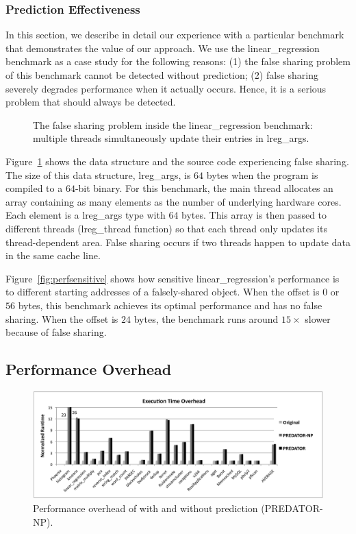 \subsubsection{Prediction Effectiveness}
\label{sec:predicteval}
In this section, we describe in detail our experience with a particular benchmark that demonstrates the value of our approach. We use the linear\_regression benchmark as a case study for the following reasons: (1) the false sharing problem of this benchmark cannot be detected without prediction; (2) false sharing severely degrades performance when it actually occurs. Hence, it is a serious problem that should always be detected. 

\begin{figure}[!t]
{\centering
\subfigure{}
\caption{The false sharing problem inside the linear\_regression benchmark: multiple threads simultaneously update their entries in lreg\_args.
\label{fig:linearregression}}
}
\end{figure}

Figure~\ref{fig:linearregression} shows the data structure and the source code experiencing false sharing. The size of this data structure, lreg\_args, is $64$ bytes 
when the program is compiled to a $64$-bit binary. For this benchmark, the main thread allocates an array containing as many elements as the number of underlying hardware cores. Each element is a lreg\_args type with $64$ bytes. This array is then passed to different threads (lreg\_thread function) so that each thread only updates its thread-dependent area. False sharing occurs if two threads happen to update data in the same cache line. 

Figure~\ref{fig:perfsensitive} shows how sensitive linear\_regression's performance is to different starting addresses of a falsely-shared object. When the offset is $0$ or $56$ bytes, this benchmark achieves its optimal performance and has no false sharing. When the offset is $24$ bytes, the benchmark runs around $15\times$ slower because of false sharing.

\subsection{Performance Overhead}
\label{sec:perfoverhead}

\begin{figure}[!t]
\centering
\includegraphics[width=6in]{fig/perf}
\caption{
Performance overhead of \Predator{} with and without prediction (PREDATOR-NP).
\label{fig:perf}}
\end{figure}


